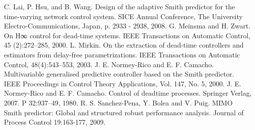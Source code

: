 \documentclass[A4, 10pt, conference]{ieeeconf}
\begin{document}
\begin{thebibliography}{99.}
%
%
 C. Lai, P. Hsu, and B. Wang. Design of the adaptive Smith predictor for the time-varying network control system. SICE Annual Conference, The University Electro-Communications, Japan, p. 2933 - 2938, 2008.
%
%
%
%
 G. Meinsma and H. Zwart. On H∞ control for dead-time
systems. IEEE Transactions on Automatic Control, 45
(2):272–285, 2000.
%
 L. Mirkin. On the extraction of dead-time controllers
and estimators from delay-free parametrizations. IEEE
Transactions on Automatic Control, 48(4):543–553,
2003.
%
 J. E. Normey-Rico and E. F. Camacho. Multivariable generalised predictive controller based on the Smith predictor. IEEE Proceedings in Control Theory Applications, Vol. 147, No. 5, 2000.
%
 J. E. Normey-Rico and E. F. Camacho. Control of deadtime
processes. Springer Verlag, 2007.
%
P%
%
32:937–49, 1980.
%
%
%
 R. S. Sanchez-Pena, Y. Bolea and V. Puig. MIMO Smith predictor: Global and structured robust performance analysis. Journal of Process Control 19:163-177, 2009.
%

\end{thebibliography}
\end{document}
